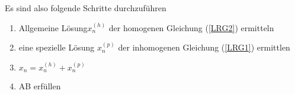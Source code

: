 \documentclass[a4paper]{scrartcl}
\begin{document}
Es sind also folgende Schritte durchzuführen
\begin{enumerate}
\item Allgemeine Lösung$x_n^{(h)}$ der homogenen Gleichung (\ref{LRG2}) ermitteln
\item eine spezielle Lösung $x_n^{(p)}$ der inhomogenen Gleichung (\ref{LRG1}) ermittlen
\item $x_n = x_n^{(h)} + x_n^{(p)}$
\item AB erfüllen
\end{enumerate}
\end{document}
